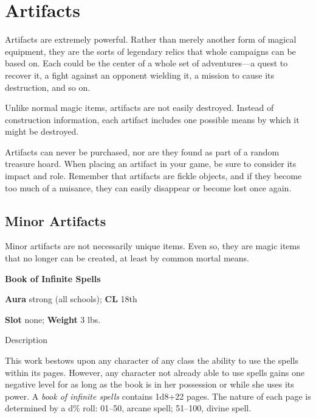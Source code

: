 \section{Artifacts}

\label{f0}				
Artifacts are extremely powerful. Rather than merely another form of magical equipment, they are the sorts of legendary relics that whole campaigns can be based on. Each could be the center of a whole set of adventures---a quest to recover it, a fight against an opponent wielding it, a mission to cause its destruction, and so on. 
				
Unlike normal magic items, artifacts are not easily destroyed. Instead of construction information, each artifact includes one possible means by which it might be destroyed.
				
Artifacts can never be purchased, nor are they found as part of a random treasure hoard. When placing an artifact in your game, be sure to consider its impact and role. Remember that artifacts are fickle objects, and if they become too much of a nuisance, they can easily disappear or become lost once again.
				
\subsection{Minor Artifacts}

				
Minor artifacts are not necessarily unique items. Even so, they are magic items that no longer can be created, at least by common mortal means.
				
\textbf{Book of Infinite Spells}
				
\textbf{Aura} strong (all schools); \textbf{CL} 18th
				
\textbf{Slot} none; \textbf{Weight} 3 lbs.
				
Description
				

This work bestows upon any character of any class the ability to use the spells within its pages. However, any character not already able to use spells gains one 
negative level 
for as long as the book is in her possession or while she uses its power. A 
\textit{book of infinite spells}
 contains 1d8+22 pages. The nature of each page is determined by a d\% roll: 01--50, arcane spell; 51--100, divine spell. 

